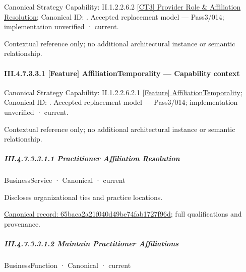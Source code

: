 {\small Canonical Strategy Capability: II.1.2.2.6.2 \hyperref[element:dd0d16f6e6b9491c85deea915bb7bf4d]{[CT3] Provider Role \& Affiliation Resolution}; Canonical ID: \texttt{}. Accepted replacement model — Pass3/014; implementation unverified · current.}\par
Contextual reference only; no additional architectural instance or semantic relationship.\par
\paragraph*{III.4.7.3.3.1 [Feature] AffiliationTemporality — Capability context}
\label{navigation:III.4.7.3.3.1}

{\small Canonical Strategy Capability: II.1.2.2.6.2.1 \hyperref[element:6beab7cbd7ec4563a82112445a0ffe46]{[Feature] AffiliationTemporality}; Canonical ID: \texttt{}. Accepted replacement model — Pass3/014; implementation unverified · current.}\par
Contextual reference only; no additional architectural instance or semantic relationship.\par
\subparagraph*{III.4.7.3.3.1.1 Practitioner Affiliation Resolution}
\label{navigation:III.4.7.3.3.1.1}

\label{element:65baca2a21f040d49be74fab1727f96d}
{\small BusinessService · Canonical · current}\par

Discloses organizational ties and practice locations.


{\footnotesize \href{../../../../../../../../continuum/business/business-service/65baca2a21f040d49be74fab1727f96d.md}{Canonical record: 65baca2a21f040d49be74fab1727f96d}; full qualifications and provenance.}\par
\subparagraph*{III.4.7.3.3.1.2 Maintain Practitioner Affiliations}
\label{navigation:III.4.7.3.3.1.2}

\label{element:7dc829546e99424dbbf8f19b4565d3fc}
{\small BusinessFunction · Canonical · current}\par

